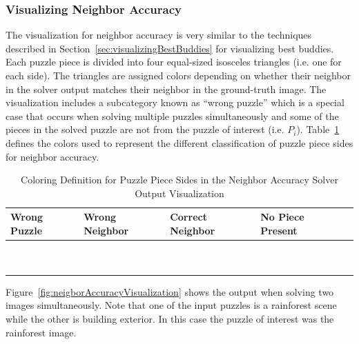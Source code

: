 \documentclass{report}
\begin{document}
\subsubsection{Visualizing Neighbor Accuracy}\label{sec:visualizingNeighborAccuracy}

The visualization for neighbor accuracy is very similar to the techniques described in Section~\ref{sec:visualizingBestBuddies} for visualizing best buddies.  Each puzzle piece is divided into four equal-sized isosceles triangles (i.e. one for each side).  The triangles are assigned colors depending on whether their neighbor in the solver output matches their neighbor in the ground-truth image.  The visualization includes a subcategory known as ``wrong puzzle'' which is a special case that occurs when solving multiple puzzles simultaneously and some of the pieces in the solved puzzle are not from the puzzle of interest (i.e. $P_i$).  Table~\ref{tab:neighborAccuracyColors} defines the colors used to represent the different classification of puzzle piece sides for neighbor accuracy.

\begin{table}[h]
\begin{center}
  \begin{tabular}{ | >{\centering\arraybackslash}m{0.6in} | >{\centering\arraybackslash}m{0.6in} | >{\centering\arraybackslash}m{0.6in} | >{\centering\arraybackslash}m{0.6in} | >{\centering\arraybackslash}m{0.6in} | }
 \hline
    Wrong Puzzle & Wrong Neighbor & Correct Neighbor  & No Piece Present  \\ \hline
	{\cellcolor{blue}~} & {\cellcolor{red}~} & {\cellcolor{green}~} & {\cellcolor{black}~}  \\
	{\cellcolor{blue}~} & {\cellcolor{red}~} & {\cellcolor{green}~} & {\cellcolor{black}~}  \\
 \hline
  \end{tabular}
\end{center}
\caption{Coloring Definition for Puzzle Piece Sides in the Neighbor Accuracy Solver Output Visualization}\label{tab:neighborAccuracyColors}
\end{table}

Figure~\ref{fig:neigborAccuracyVisualization} shows the output when solving two images simultaneously.  Note that one of the input puzzles is a rainforest scene while the other is building exterior.  In this case the puzzle of interest was the rainforest image.  
\end{document}
